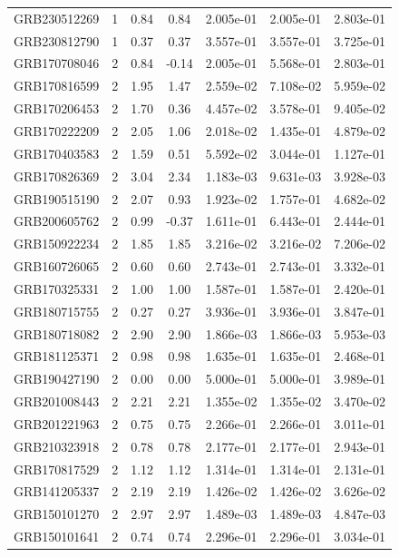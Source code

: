 \documentclass[12pt]{article}
\begin{document}
\begin{table}[h!]
{\begin{tabular}{l c c c c c c}
GRB230512269 & 1 & 0.84 & 0.84 & 2.005e-01 & 2.005e-01 & 2.803e-01 \\
GRB230812790 & 1 & 0.37 & 0.37 & 3.557e-01 & 3.557e-01 & 3.725e-01 \\
GRB170708046 & 2 & 0.84 & -0.14 & 2.005e-01 & 5.568e-01 & 2.803e-01 \\
GRB170816599 & 2 & 1.95 & 1.47 & 2.559e-02 & 7.108e-02 & 5.959e-02 \\
GRB170206453 & 2 & 1.70 & 0.36 & 4.457e-02 & 3.578e-01 & 9.405e-02 \\
GRB170222209 & 2 & 2.05 & 1.06 & 2.018e-02 & 1.435e-01 & 4.879e-02 \\
GRB170403583 & 2 & 1.59 & 0.51 & 5.592e-02 & 3.044e-01 & 1.127e-01 \\
GRB170826369 & 2 & 3.04 & 2.34 & 1.183e-03 & 9.631e-03 & 3.928e-03 \\
GRB190515190 & 2 & 2.07 & 0.93 & 1.923e-02 & 1.757e-01 & 4.682e-02 \\
GRB200605762 & 2 & 0.99 & -0.37 & 1.611e-01 & 6.443e-01 & 2.444e-01 \\
GRB150922234 & 2 & 1.85 & 1.85 & 3.216e-02 & 3.216e-02 & 7.206e-02 \\
GRB160726065 & 2 & 0.60 & 0.60 & 2.743e-01 & 2.743e-01 & 3.332e-01 \\
GRB170325331 & 2 & 1.00 & 1.00 & 1.587e-01 & 1.587e-01 & 2.420e-01 \\
GRB180715755 & 2 & 0.27 & 0.27 & 3.936e-01 & 3.936e-01 & 3.847e-01 \\
GRB180718082 & 2 & 2.90 & 2.90 & 1.866e-03 & 1.866e-03 & 5.953e-03 \\
GRB181125371 & 2 & 0.98 & 0.98 & 1.635e-01 & 1.635e-01 & 2.468e-01 \\
GRB190427190 & 2 & 0.00 & 0.00 & 5.000e-01 & 5.000e-01 & 3.989e-01 \\
GRB201008443 & 2 & 2.21 & 2.21 & 1.355e-02 & 1.355e-02 & 3.470e-02 \\
GRB201221963 & 2 & 0.75 & 0.75 & 2.266e-01 & 2.266e-01 & 3.011e-01 \\
GRB210323918 & 2 & 0.78 & 0.78 & 2.177e-01 & 2.177e-01 & 2.943e-01 \\
GRB170817529 & 2 & 1.12 & 1.12 & 1.314e-01 & 1.314e-01 & 2.131e-01 \\
GRB141205337 & 2 & 2.19 & 2.19 & 1.426e-02 & 1.426e-02 & 3.626e-02 \\
GRB150101270 & 2 & 2.97 & 2.97 & 1.489e-03 & 1.489e-03 & 4.847e-03 \\
GRB150101641 & 2 & 0.74 & 0.74 & 2.296e-01 & 2.296e-01 & 3.034e-01 \\

\end{tabular}}
\end{table}
\end{document}
